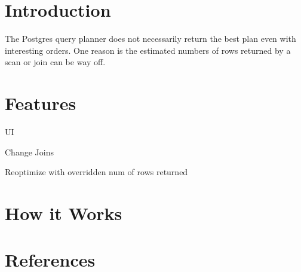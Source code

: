 \documentclass[letterpaper,10pt]{article}
\begin{document}
\raggedright

\setlength{\columnseprule}{0.5pt}


\section{Introduction}
The Postgres query planner does not necessarily return the best plan even with
interesting orders. One reason is the estimated numbers of rows returned by a
scan or join can be way off.

\section{Features}
UI

Change Joins

Reoptimize with overridden num of rows returned

\section{How it Works}

\section{References}
\end{document}
